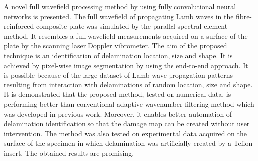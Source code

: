 A novel full wavefield processing method by using fully convolutional neural networks is presented.
The full wavefield of propagating Lamb waves in the fibre-reinforced composite plate was simulated by the parallel spectral element method.
It resembles a full wavefield measurements acquired on a surface of the plate by the scanning laser Doppler vibrometer.
The aim of the proposed technique is an identification of delamination location, size and shape.
It is achieved by pixel-wise image segmentation by using the end-to-end approach.
It is possible because of the large dataset of Lamb wave propagation patterns resulting from interaction with delaminations of random location, size and shape.
It is demonstrated that the proposed method, tested on numerical data, is performing better than conventional adaptive wavenumber filtering method which was developed in previous work.
Moreover, it enables better automation of delamination identification so that the damage map can be created without user intervention.
The method was also tested on experimental data acquired on the surface of the specimen in which delamination was artificially created by a Teflon insert.
The obtained results are promising.